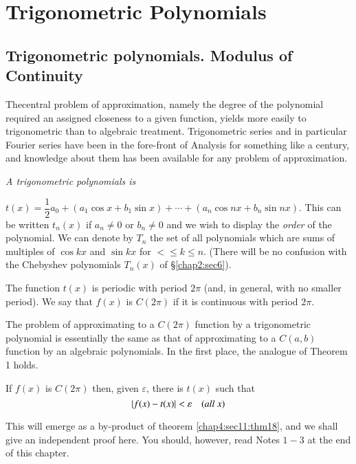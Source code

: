 \chapter{Trigonometric Polynomials}\label{chap4}

\setcounter{section}{9}
\section{Trigonometric polynomials. Modulus of Continuity}\label{chap4:sec10}

The\pageoriginale central problem of approximation, namely the degree of the
polynomial required an assigned closeness to a given function, yields
more easily to trigonometric than to algebraic
treatment. Trigonometric series and in particular Fourier series have
been in the fore-front of Analysis for something like a century, and
knowledge about them has been available for any problem of
approximation. 

\textit{A trigonometric polynomials is}

$t(x)=\dfrac{1}{2}a_0 + (a_1 \cos x+ b_1 \sin x)+ \cdots + (a_n \cos
nx+ b_n \sin nx)$. This can be written $t_n(x)$ if $a_n \neq 0$ or $b_n
\neq 0$ and we wish to display the \textit{order} of the
polynomial. We can denote by $T_n$ the set of all polynomials which
are sums of multiples of $\cos kx$ and $\sin kx$ for $< \leq k \leq
n$. (There will be no confusion with the Chebyshev polynomials $T_n
(x)$ of \S \ref{chap2:sec6}). 

The function $t(x)$ is periodic with period $2 \pi$ (and, in general,
with no smaller period). We say that $f(x)$ is $C(2\pi)$ if it is
continuous with period $2 \pi$. 

The problem of approximating to a $C(2\pi)$ function by a
trigonometric polynomial is essentially the same as that of
approximating to a $C(a,b)$ function by an algebraic polynomials. In
the first place, the analogue of Theorem 1 holds. 

\begin{theorem}[Weierstrass]\label{chap4:sec10:thm15} %
  If $f(x)$ is $C(2\pi)$ then, given $\varepsilon$,
  there is $t(x)$ such that 
  $$
  |f(x)-t(x)|< \varepsilon \quad \text(all ~x)
  $$
  
  This will emerge as a by-product of theorem \ref{chap4:sec11:thm18}, and we shall give an
  independent proof here. You should, however, read Notes $1-3$ at the
  end of this chapter. 
\end{theorem}

